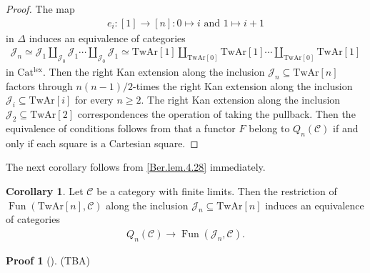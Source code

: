 \documentclass[a4paper,dvipdfmx,11pt,reqno]{amsart}
\DeclareMathOperator{\Fun}{Fun}
\newcommand{\C}{\mathcal{C}}
\newcommand{\J}{\mathcal{J}}
\newcommand{\Catlex}{\mathrm{Cat^{lex}}}
\newcommand{\TwAr}{\mathrm{TwAr}}
\theoremstyle{definition}
\newtheorem{corollary}[theorem]{Corollary}
\newtheorem{newproof}[theorem]{Proof}
\begin{document}
\begin{proof}
  The map 
  \begin{align*}
    e_i : [1] \to [n] : 0 \mapsto i \text{ and } 1 \mapsto i+1
  \end{align*}
  in $\Delta$ induces an equivalence of categories 
  \begin{align*}
    \J_n 
    \simeq \J_1 \coprod_{\J_0} \J_1 \cdots \coprod_{\J_0} \J_1 
    \simeq \TwAr[1] \coprod_{\TwAr[0]} \TwAr[1] \cdots \coprod_{\TwAr[0]} \TwAr[1]
  \end{align*}
  in $\Catlex$.
  Then the right Kan extension along the inclusion $\J_n \subseteq \TwAr[n]$ factors through $n(n-1)/2$-times the right Kan extension along the inclusion $\J_i \subseteq \TwAr[i]$ for every $n \geq 2$.
  The right Kan extension along the inclusion $\J_2 \subseteq \TwAr[2]$ correspondences the operation of taking the pullback.
  Then the equivalence of conditions follows from that a functor $F$ belong to $Q_n(\C)$ if and only if each square is a Cartesian square.
\end{proof}

The next corollary follows from \cref{Ber.lem.4.28} immediately.

\begin{corollary} \label{Ber.cor.4.31}
  Let $\C$ be a category with finite limits.
  Then the restriction of $\Fun(\TwAr[n],\C)$ along the inclusion $\J_n \subseteq \TwAr[n]$ induces an equivalence of categories
  \begin{align*}
    Q_n(\C) \to \Fun(\J_n,\C).
  \end{align*}
\end{corollary}

\begin{newproof}[] \label{proof_of_HLS23.prop.3.2}
  (TBA)
\end{newproof}

\printbibliography
\end{document}
